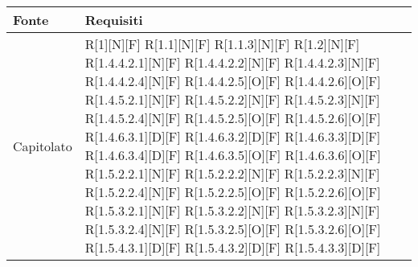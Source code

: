 
\begin{longtable}{X | X}  
			\rowcolor{orange!85}Fonte & Requisiti \\
\endhead
Capitolato & R[1][N][F] \newline
R[1.1][N][F] \newline
R[1.1.3][N][F] \newline
R[1.2][N][F] \newline
R[1.4.4.2.1][N][F] \newline
R[1.4.4.2.2][N][F] \newline
R[1.4.4.2.3][N][F] \newline
R[1.4.4.2.4][N][F] \newline
R[1.4.4.2.5][O][F] \newline
R[1.4.4.2.6][O][F] \newline
R[1.4.5.2.1][N][F] \newline
R[1.4.5.2.2][N][F] \newline
R[1.4.5.2.3][N][F] \newline
R[1.4.5.2.4][N][F] \newline
R[1.4.5.2.5][O][F] \newline
R[1.4.5.2.6][O][F] \newline
R[1.4.6.3.1][D][F] \newline
R[1.4.6.3.2][D][F] \newline
R[1.4.6.3.3][D][F] \newline
R[1.4.6.3.4][D][F] \newline
R[1.4.6.3.5][O][F] \newline
R[1.4.6.3.6][O][F] \newline
R[1.5.2.2.1][N][F] \newline
R[1.5.2.2.2][N][F] \newline
R[1.5.2.2.3][N][F] \newline
R[1.5.2.2.4][N][F] \newline
R[1.5.2.2.5][O][F] \newline
R[1.5.2.2.6][O][F] \newline
R[1.5.3.2.1][N][F] \newline
R[1.5.3.2.2][N][F] \newline
R[1.5.3.2.3][N][F] \newline
R[1.5.3.2.4][N][F] \newline
R[1.5.3.2.5][O][F] \newline
R[1.5.3.2.6][O][F] \newline
R[1.5.4.3.1][D][F] \newline
R[1.5.4.3.2][D][F] \newline
R[1.5.4.3.3][D][F] \newline

\end{longtable}
